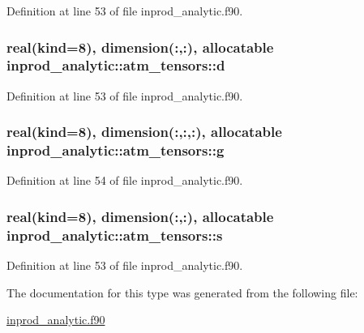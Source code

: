 Definition at line 53 of file inprod\-\_\-analytic.\-f90.

\hypertarget{structinprod__analytic_1_1atm__tensors_a00e06ac193f03e4dcd337439cc489f78}{
\subsubsection[{d}]{\setlength{\rightskip}{0pt plus 5cm}real(kind=8), dimension(\-:,\-:), allocatable inprod\-\_\-analytic\-::atm\-\_\-tensors\-::d\hspace{0.3cm}{\ttfamily [private]}}}\label{structinprod__analytic_1_1atm__tensors_a00e06ac193f03e4dcd337439cc489f78}


Definition at line 53 of file inprod\-\_\-analytic.\-f90.

\hypertarget{structinprod__analytic_1_1atm__tensors_a9b4ecfbc139ac739d5ec82b087e421a5}{
\subsubsection[{g}]{\setlength{\rightskip}{0pt plus 5cm}real(kind=8), dimension(\-:,\-:,\-:), allocatable inprod\-\_\-analytic\-::atm\-\_\-tensors\-::g\hspace{0.3cm}{\ttfamily [private]}}}\label{structinprod__analytic_1_1atm__tensors_a9b4ecfbc139ac739d5ec82b087e421a5}


Definition at line 54 of file inprod\-\_\-analytic.\-f90.

\hypertarget{structinprod__analytic_1_1atm__tensors_ad95a5329b72aae59807e7cdf043ab52c}{
\subsubsection[{s}]{\setlength{\rightskip}{0pt plus 5cm}real(kind=8), dimension(\-:,\-:), allocatable inprod\-\_\-analytic\-::atm\-\_\-tensors\-::s\hspace{0.3cm}{\ttfamily [private]}}}\label{structinprod__analytic_1_1atm__tensors_ad95a5329b72aae59807e7cdf043ab52c}


Definition at line 53 of file inprod\-\_\-analytic.\-f90.



The documentation for this type was generated from the following file\-:\begin{DoxyCompactItemize}
\item 
\hyperlink{inprod__analytic_8f90}{inprod\-\_\-analytic.\-f90}\end{DoxyCompactItemize}
